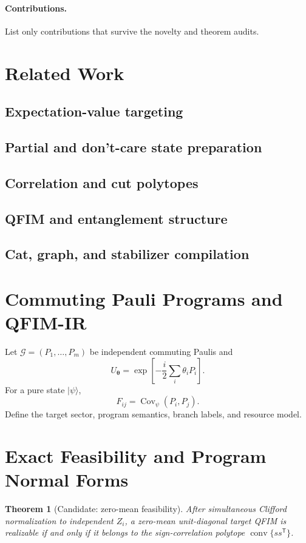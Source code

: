 \documentclass[11pt]{article}
\newtheorem{theorem}{Theorem}
\begin{document}
\paragraph{Contributions.}
List only contributions that survive the novelty and theorem audits.

\section{Related Work}
\subsection{Expectation-value targeting}
\subsection{Partial and don't-care state preparation}
\subsection{Correlation and cut polytopes}
\subsection{QFIM and entanglement structure}
\subsection{Cat, graph, and stabilizer compilation}

\section{Commuting Pauli Programs and QFIM-IR}
Let $\mathcal G=(P_1,\ldots,P_m)$ be independent commuting Paulis and
\[
U_{\bm\theta}=\exp\!\left[-\frac{i}{2}\sum_i\theta_iP_i\right].
\]
For a pure state $|\psi\rangle$,
\[
F_{ij}=\operatorname{Cov}_\psi(P_i,P_j).
\]
Define the target sector, program semantics, branch labels, and resource model.

\section{Exact Feasibility and Program Normal Forms}
\begin{theorem}[Candidate: zero-mean feasibility]
After simultaneous Clifford normalization to independent $Z_i$, a zero-mean unit-diagonal target QFIM is realizable if and only if it belongs to the sign-correlation polytope $\operatorname{conv}\{ss^{\mathsf T}\}$.
\end{theorem}
\end{document}
